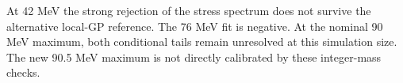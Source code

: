At 42 MeV the strong rejection of the stress spectrum does not survive the alternative local-GP reference. The 76 MeV fit is negative. At the nominal 90 MeV maximum, both conditional tails remain unresolved at this simulation size. The new 90.5 MeV maximum is not directly calibrated by these integer-mass checks.
